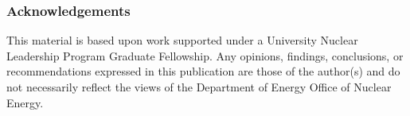 \begin{frame}
    \frametitle{Acknowledgements}
    This material is based upon work supported under a University 
    Nuclear Leadership Program Graduate Fellowship. Any opinions, findings, conclusions, or 
recommendations expressed in this publication are those of the author(s) 
and do not necessarily reflect the views of the Department of Energy Office 
of Nuclear Energy.

\end{frame}